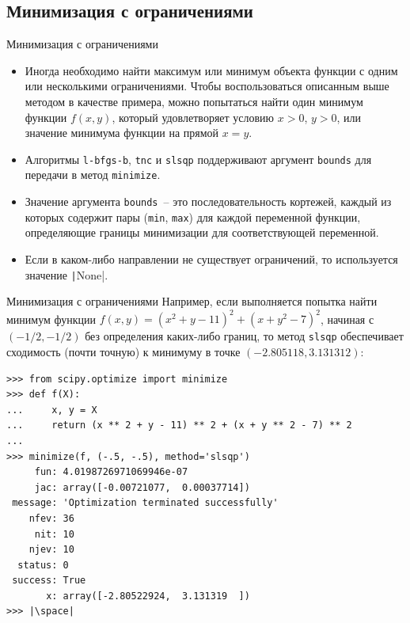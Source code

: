 \documentclass[aspectratio=169, mathserif]{beamer}	%
\begin{document}
\subsection{Минимизация с ограничениями}
\begin{frame}[fragile]{Минимизация с ограничениями}
\scriptsize
\begin{itemize}
\item Иногда необходимо найти максимум или минимум объекта функции с одним или несколькими ограничениями. Чтобы воспользоваться описанным выше методом в качестве примера, можно попытаться найти один минимум функции $f(x,y)$, который удовлетворяет условию $x > 0$, $y > 0$, или значение минимума функции на прямой $x = y$.
\item Алгоритмы \texttt{l-bfgs-b}, \texttt{tnc} и \texttt{slsqp} поддерживают аргумент \texttt{bounds} для передачи в метод \texttt{minimize}.
\item Значение аргумента \texttt{bounds}~-- это последовательность
кортежей, каждый из которых содержит пары (\texttt{min}, \texttt{max}) для каждой переменной функции, определяющие границы минимизации для соответствующей переменной.
\item Если в каком-либо направлении не существует ограничений, то используется значение \texttt|None|.
\end{itemize}
\vfill
\end{frame}


\begin{frame}[fragile]{Минимизация с ограничениями}
\scriptsize
Например, если выполняется попытка найти минимум функции $f\left(x, y\right) = \left(x^2 + y - 11\right)^2 + \left(x + y^2 - 7\right)^2$, начиная с $\left(−1/2, −1/2\right)$ без определения каких-либо границ, то метод \texttt{slsqp} обеспечивает сходимость (почти точную) к минимуму в точке $(−2.805118, 3.131312)$:
\vfill
\begin{verbatim}
>>> from scipy.optimize import minimize
>>> def f(X):
...     x, y = X
...     return (x ** 2 + y - 11) ** 2 + (x + y ** 2 - 7) ** 2
...
>>> minimize(f, (-.5, -.5), method='slsqp')
     fun: 4.0198726971069946e-07
     jac: array([-0.00721077,  0.00037714])
 message: 'Optimization terminated successfully'
    nfev: 36
     nit: 10
    njev: 10
  status: 0
 success: True
       x: array([-2.80522924,  3.131319  ])
>>> |\space|
\end{verbatim}
\vfill
\end{frame}
\end{document}
